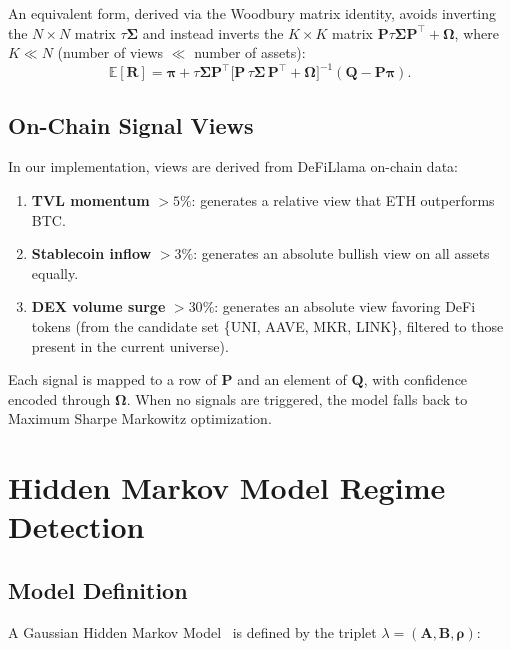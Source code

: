 \documentclass[12pt,a4paper]{article}
\newcommand{\E}{\mathbb{E}}
\begin{document}
An equivalent form, derived via the Woodbury matrix identity, avoids inverting the $N \times N$ matrix $\tau\bm{\Sigma}$ and instead inverts the $K \times K$ matrix $\bm{P}\tau\bm{\Sigma}\bm{P}^\top + \bm{\Omega}$, where $K \ll N$ (number of views $\ll$ number of assets):
\begin{equation}
    \E[\bm{R}] = \bm{\pi} + \tau\bm{\Sigma}\bm{P}^\top
        \bigl[\bm{P}\,\tau\bm{\Sigma}\,\bm{P}^\top + \bm{\Omega}\bigr]^{-1}
        (\bm{Q} - \bm{P}\bm{\pi}).
    \label{eq:bl-alt}
\end{equation}

\subsection{On-Chain Signal Views}
\label{sec:bl-onchain}

In our implementation, views are derived from DeFiLlama on-chain data:

\begin{enumerate}[nosep]
    \item \textbf{TVL momentum} $> 5\%$: generates a relative view that ETH outperforms BTC.
    \item \textbf{Stablecoin inflow} $> 3\%$: generates an absolute bullish view on all assets equally.
    \item \textbf{DEX volume surge} $> 30\%$: generates an absolute view favoring DeFi tokens (from the candidate set \{UNI, AAVE, MKR, LINK\}, filtered to those present in the current universe).
\end{enumerate}

Each signal is mapped to a row of $\bm{P}$ and an element of $\bm{Q}$, with confidence encoded through $\bm{\Omega}$. When no signals are triggered, the model falls back to Maximum Sharpe Markowitz optimization.

\section{Hidden Markov Model Regime Detection}
\label{sec:hmm}

\subsection{Model Definition}

A Gaussian Hidden Markov Model~\cite{rabiner1989,baum1970} is defined by the triplet $\lambda = (\bm{A}, \bm{B}, \bm{\rho})$:
\end{document}
